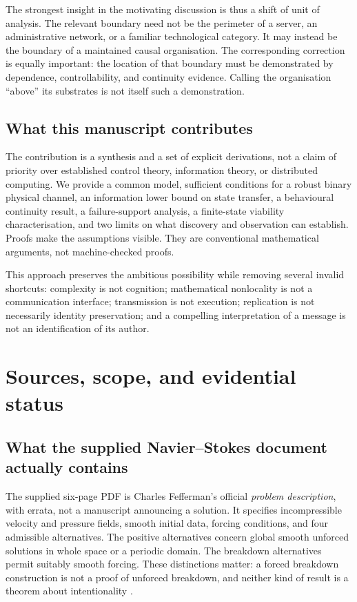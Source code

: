 \documentclass[11pt,a4paper]{article}
\theoremstyle{definition}
\theoremstyle{remark}
\begin{document}
The strongest insight in the motivating discussion is thus a shift of unit of analysis. The relevant boundary need not be the perimeter of a server, an administrative network, or a familiar technological category. It may instead be the boundary of a maintained causal organisation. The corresponding correction is equally important: the location of that boundary must be demonstrated by dependence, controllability, and continuity evidence. Calling the organisation ``above'' its substrates is not itself such a demonstration.

\subsection{What this manuscript contributes}
The contribution is a synthesis and a set of explicit derivations, not a claim of priority over established control theory, information theory, or distributed computing. We provide a common model, sufficient conditions for a robust binary physical channel, an information lower bound on state transfer, a behavioural continuity result, a failure-support analysis, a finite-state viability characterisation, and two limits on what discovery and observation can establish. Proofs make the assumptions visible. They are conventional mathematical arguments, not machine-checked proofs.

This approach preserves the ambitious possibility while removing several invalid shortcuts: complexity is not cognition; mathematical nonlocality is not a communication interface; transmission is not execution; replication is not necessarily identity preservation; and a compelling interpretation of a message is not an identification of its author.

\section{Sources, scope, and evidential status}\label{sec:sources}
\subsection{What the supplied Navier--Stokes document actually contains}
The supplied six-page PDF is Charles Fefferman's official \emph{problem description}, with errata, not a manuscript announcing a solution. It specifies incompressible velocity and pressure fields, smooth initial data, forcing conditions, and four admissible alternatives. The positive alternatives concern global smooth unforced solutions in whole space or a periodic domain. The breakdown alternatives permit suitably smooth forcing. These distinctions matter: a forced breakdown construction is not a proof of unforced breakdown, and neither kind of result is a theorem about intentionality \citep{fefferman}.
\end{document}
